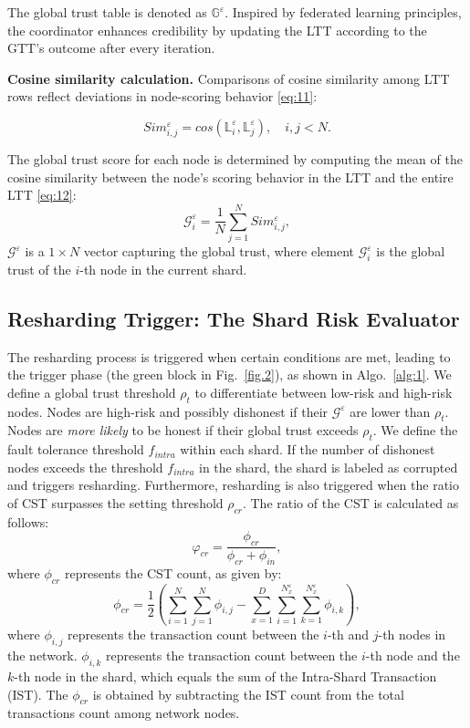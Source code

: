 The global trust table is denoted as $\mathbb{G}^\varepsilon$. Inspired by federated learning principles, the coordinator enhances credibility by updating the LTT according to the GTT's outcome after every iteration. 

\smallskip
\noindent\textbf{Cosine similarity calculation.} Comparisons of cosine similarity among LTT rows reflect deviations in node-scoring behavior \eqref{eq:11}:

\begin{equation}
    \label{eq:11}
    Sim^\varepsilon_{i,j}=cos(\mathbb{L}^\varepsilon_{i},\mathbb{L}^\varepsilon_{j}), \quad i,j<N.
\end{equation}

The global trust score for each node is determined by computing the mean of the cosine similarity between the node's scoring behavior in the LTT and the entire LTT \eqref{eq:12}:
\begin{equation}
    \label{eq:12}
    \mathcal{G}_{i}^\varepsilon = \frac{1}{N}\sum_{j=1}^{N} Sim^\varepsilon_{i,j},
\end{equation}
$\mathcal{G}^\varepsilon$ is a $1 \times N$ vector capturing the global trust, where element $\mathcal{G}_{i}^\varepsilon$ is the global trust of the $i$-th node in the current shard. 


\subsection{Resharding Trigger: The Shard Risk Evaluator}
The resharding process is triggered when certain conditions are met, leading to the trigger phase (the green block in Fig.~\ref{fig.2}), as shown in Algo.~\ref{alg:1}. We define a global trust threshold $\rho_{t}$ to differentiate between low-risk and high-risk nodes. Nodes are high-risk and possibly dishonest if their $\mathcal{G}^\varepsilon$ are lower than $\rho_{t}$. Nodes are \textit{more likely} to be honest if their global trust exceeds $\rho_{t}$. 
We define the fault tolerance threshold $f_{intra}$ within each shard.
If the number of dishonest nodes exceeds the threshold $f_{intra}$ in the shard, the shard is labeled as corrupted and triggers resharding. Furthermore, resharding is also triggered when the ratio of CST surpasses the setting threshold $\rho_{cr}$. The ratio of the CST is calculated as follows:
\begin{equation}
    \label{eq:13}
    \varphi_{cr} = \frac{\phi_{cr}} {\phi_{cr} + \phi_{in}},
\end{equation}
where $\phi_{cr}$ represents the CST count, as given by:
\begin{equation}
    \label{eq:14}
    \phi_{cr} = \frac{1}{2} \left (\sum_{i=1}^{N} \sum_{j=1}^{N} \phi_{i, j} - \sum_{x=1}^{D} \sum_{i=1}^{N_x^\varepsilon} \sum_{k=1}^{N_x^\varepsilon} \phi_{i, k} \right ),
\end{equation}
where $\phi_{i, j}$ represents the transaction count between the $i$-th and $j$-th nodes in the network. $\phi_{i,k}$ represents the transaction count between the $i$-th node and the $k$-th node in the shard, which equals the sum of the Intra-Shard Transaction (IST). The $\phi_{cr}$ is obtained by subtracting the IST count from the total transactions count among network nodes.


